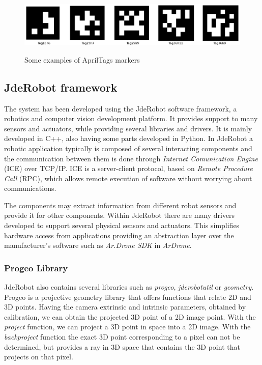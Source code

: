 \documentclass{styles/svproc}
\begin{document}
	\begin{figure}[h]
		\begin{center}
		{\includegraphics[width=\linewidth]{ejemplosapriltags.png}}
		\end{center}
		\caption{Some examples of AprilTags markers}
		\label{fig:apriltags}
	\end{figure}
	
\subsection{JdeRobot framework}

	The system has been developed using the JdeRobot software framework, a robotics and computer vision development platform. It provides support to many sensors and actuators, while providing several libraries and drivers. It is mainly developed in C++, also having some parts developed in Python. In JdeRobot a robotic application typically is composed of several interacting components and the communication between them is done through \textit{Internet Comunication Engine} (ICE) over TCP/IP. ICE is a server-client protocol, based on \textit{Remote Procedure Call} (RPC), which allows remote execution of software without worrying about communications.

 The components may extract information from different robot sensors and provide it for other components. Within JdeRobot there are many drivers developed to support several physical sensors and actuators. This simplifies hardware access from applications providing an abstraction layer over the manufacturer's software such as \textit{Ar.Drone SDK} in \textit{ArDrone}. 

        \subsubsection{Progeo Library}
        
        JdeRobot also contains several libraries such as \textit{progeo}, \textit{jderobotutil} or \textit{geometry}. Progeo is a projective geometry library that offers functions that relate 2D and 3D points. Having the camera extrinsic and intrinsic parameters, obtained by calibration, we can obtain the projected 3D point of a 2D image point. With the \textit{project} function, we can project a 3D point in space into a 2D image. With the \textit{backproject} function the exact 3D point corresponding to a pixel can not be determined, but provides a ray in 3D space that contains the 3D point that projects on that pixel.
\end{document}
